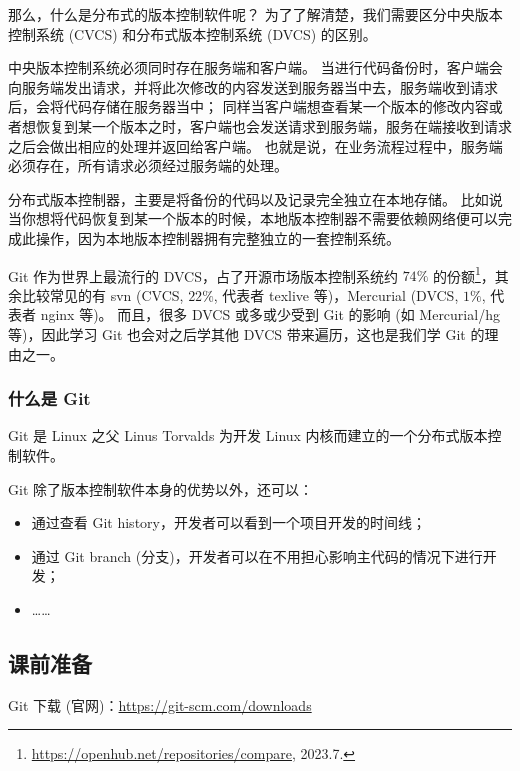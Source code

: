 \documentclass{article}
\begin{document}
	那么，什么是分布式的版本控制软件呢？
	为了了解清楚，我们需要区分中央版本控制系统 (CVCS) 和分布式版本控制系统 (DVCS) 的区别。

	中央版本控制系统必须同时存在服务端和客户端。
	当进行代码备份时，客户端会向服务端发出请求，并将此次修改的内容发送到服务器当中去，服务端收到请求后，会将代码存储在服务器当中；
	同样当客户端想查看某一个版本的修改内容或者想恢复到某一个版本之时，客户端也会发送请求到服务端，服务在端接收到请求之后会做出相应的处理并返回给客户端。
	也就是说，在业务流程过程中，服务端必须存在，所有请求必须经过服务端的处理。

	分布式版本控制器，主要是将备份的代码以及记录完全独立在本地存储。
	比如说当你想将代码恢复到某一个版本的时候，本地版本控制器不需要依赖网络便可以完成此操作，因为本地版本控制器拥有完整独立的一套控制系统。\cite{net9-git}

	\noindent\hrulefill

	Git 作为世界上最流行的 DVCS，占了开源市场版本控制系统约 $74 \%$ 的份额\footnote{\url{https://openhub.net/repositories/compare}, 2023.7.}，其余比较常见的有 svn (CVCS, $22 \%$, 代表者 texlive 等)，Mercurial (DVCS, $1 \%$, 代表者 nginx 等)。
	而且，很多 DVCS 或多或少受到 Git 的影响 (如 Mercurial/hg 等)，因此学习 Git 也会对之后学其他 DVCS 带来遍历，这也是我们学 Git 的理由之一。

	\subsubsection[什么是 Git]{什么是 Git\protect\cite{net9-git}}

	Git 是 Linux 之父 Linus Torvalds 为开发 Linux 内核而建立的一个分布式版本控制软件。

	Git 除了版本控制软件本身的优势以外，还可以：

	\begin{itemize}
		\itemsep0pt
		\item 通过查看 Git history，开发者可以看到一个项目开发的时间线；
		\item 通过 Git branch (分支)，开发者可以在不用担心影响主代码的情况下进行开发；
		\item ……
	\end{itemize}

	\pagebreak

	\subsection{课前准备}

	Git 下载 (官网)：\url{https://git-scm.com/downloads}
\end{document}
